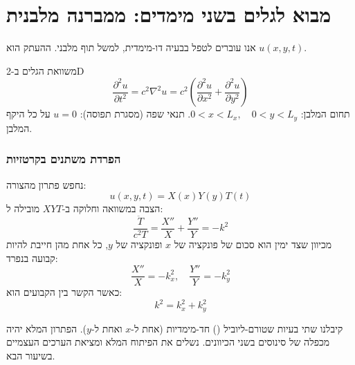 \section{מבוא לגלים בשני מימדים: ממברנה מלבנית}

אנו עוברים לטפל בבעיה דו-מימדית, למשל תוף מלבני. ההעתק הוא $u(x,y,t)$.

\begin{definitionbox}{משוואת הגלים ב-2D}
$$\frac{\partial^2 u}{\partial t^2} = c^2 \nabla^2 u = c^2 \left( \frac{\partial^2 u}{\partial x^2} + \frac{\partial^2 u}{\partial y^2} \right)$$
תחום המלבן: $0 < x < L_x, \quad 0 < y < L_y$.
תנאי שפה (מסגרת תפוסה): $u=0$ על כל היקף המלבן.
\end{definitionbox}

\subsubsection{הפרדת משתנים בקרטזיות}
נחפש פתרון מהצורה:
$$u(x,y,t) = X(x)Y(y)T(t)$$
הצבה במשוואה וחלוקה ב-$XYT$ מובילה ל:
$$\frac{\ddot{T}}{c^2 T} = \frac{X''}{X} + \frac{Y''}{Y} = -k^2$$
מכיוון שצד ימין הוא סכום של פונקציה של $x$ ופונקציה של $y$, כל אחת מהן חייבת להיות קבועה בנפרד:
$$\frac{X''}{X} = -k_x^2, \quad \frac{Y''}{Y} = -k_y^2$$
כאשר הקשר בין הקבועים הוא:
$$k^2 = k_x^2 + k_y^2$$

קיבלנו שתי בעיות שטורם-ליוביל () חד-מימדיות (אחת ל-$x$ ואחת ל-$y$). הפתרון המלא יהיה מכפלה של סינוסים בשני הכיוונים. נשלים את הפיתוח המלא ומציאת הערכים העצמיים בשיעור הבא.